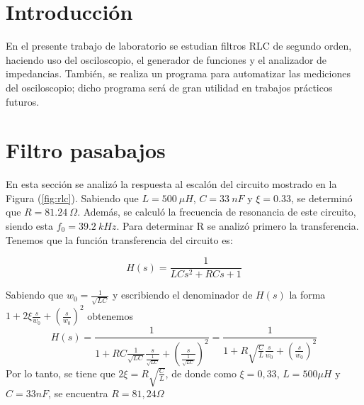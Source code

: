 

\usepackage{subfigure}







\tableofcontents
\newpage


\section{Introducción}
En el presente trabajo de laboratorio se estudian filtros RLC de segundo orden, haciendo uso del osciloscopio, el generador de funciones y el analizador de impedancias. También, se realiza un programa para automatizar las mediciones del osciloscopio; dicho programa será de gran utilidad en trabajos prácticos futuros.



\section{Filtro pasabajos}

En esta sección se analizó la respuesta al escalón del circuito mostrado en la Figura (\ref{fig:rlc}). Sabiendo que $L = 500 \ \mu H$, $C = 33 \ nF$ y $\xi = 0.33$, se determinó que $R = 81.24 \ \Omega$. Además, se calculó la frecuencia de resonancia de este circuito, siendo esta $f_0 = 39.2 \ kHz$. Para determinar R se analizó primero la transferencia. Tenemos que la función transferencia del circuito es:

\begin{equation}
	H(s) = \frac{1}{LC s^2 + RC s + 1}
	\label{equ:hrlc}
\end{equation}

Sabiendo que $w_0=\frac{1}{\sqrt{LC}}$ y escribiendo el denominador de $H(s)$ la forma $1+2\xi\frac{s}{w_0}+(\frac{s}{w_0})^2$ obtenemos \begin{equation}
    H(s)=\frac{1}{1+RC\frac{1}{\sqrt{LC}}\frac{s}{\frac{1}{\sqrt{LC}}}+(\frac{s}{\frac{1}{\sqrt{LC}}})^2}=\frac{1}{1+R\sqrt{\frac{C}{L}}\frac{s}{w_0}+(\frac{s}{w_0})^2}
\end{equation}
Por lo tanto, se tiene que $2\xi=R\sqrt{\frac{C}{L}}$, de donde como $\xi=0,33$, $L=500\mu H$ y $C=33nF$, se encuentra $R=81,24\Omega$


